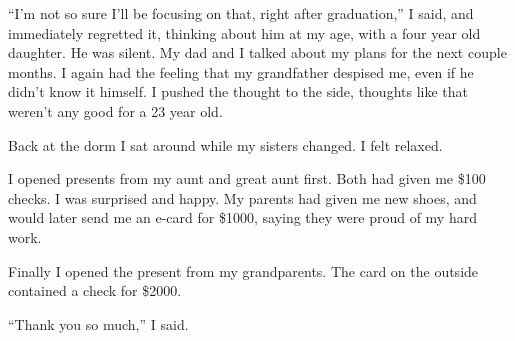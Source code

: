 ``I'm not so sure I'll be focusing on that, right after graduation,'' I said,
and immediately regretted it, thinking about him at my age, with a four year old
daughter.  He was silent.  My dad and I talked about my plans for the next
couple months.  I again had the feeling that my grandfather despised me, even if
he didn't know it himself.  I pushed the thought to the side, thoughts like that
weren't any good for a 23 year old.

Back at the dorm I sat around while my sisters changed.  I felt relaxed.

I opened presents from my aunt and great aunt first.  Both had given me \$100
checks.  I was surprised and happy.  My parents had given me new shoes, and
would later send me an e-card for \$1000, saying they were proud of my hard
work.  

Finally I opened the present from my grandparents.  The card on the outside
contained a check for \$2000.  

``Thank you so much,'' I said.
